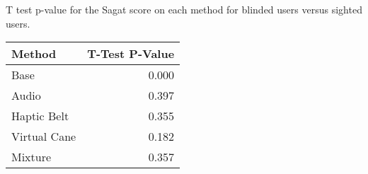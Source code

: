 
\centering
\caption{T test p-value for the Sagat score on each method for blinded users versus sighted users.}
\label{tab:ttest_sagat_score}
\begin{tabular}{lr}
\toprule
      Method &  T-Test P-Value \\
\midrule
        Base &           0.000 \\
       Audio &           0.397 \\
 Haptic Belt &           0.355 \\
Virtual Cane &           0.182 \\
     Mixture &           0.357 \\
\bottomrule
\end{tabular}
